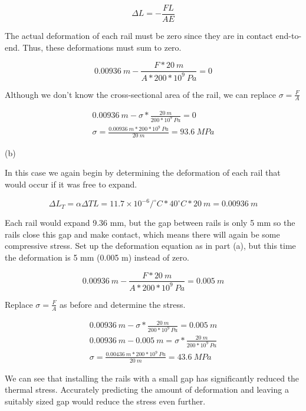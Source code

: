 \documentclass[
  letterpaper,
  DIV=11,
  numbers=noendperiod]{scrreprt}
\begin{document}
\begin{tcolorbox}
\begin{tcolorbox}
\[
\Delta L=-\frac{F L}{A E}
\]

The actual deformation of each rail must be zero since they are in
contact end-to-end. Thus, these deformations must sum to zero.

\[
0.00936{~m}-\frac{F * 20{~m}}{A * 200 * 10^9{~Pa}}=0
\]

Although we don't know the cross-sectional area of the rail, we can
replace \(\sigma=\frac{F}{A}\)

\[
\begin{gathered}
0.00936{~m}-\sigma * \frac{20{~m}}{200 * 10^9{~Pa}}=0 \\
\sigma=\frac{0.00936{~m} * 200 * 10^9{~Pa}}{20{~m}}=93.6{~MPa}
\end{gathered}
\]

(b)

In this case we again begin by determining the deformation of each rail
that would occur if it was free to expand.

\[
\Delta L_T=\alpha \Delta T L=11.7 \times 10^{-6}/^\circ{C} * 40^\circ{C} * 20{~m}=0.00936{~m}
\]

Each rail would expand 9.36 mm, but the gap between rails is only 5 mm
so the rails close this gap and make contact, which means there will
again be some compressive stress. Set up the deformation equation as in
part (a), but this time the deformation is 5 mm (0.005 m) instead of
zero.

\[
0.00936{~m}-\frac{F * 20{~m}}{A * 200 * 10^9{~Pa}}=0.005{~m}
\]

Replace \(\sigma=\frac{F}{A}\) as before and determine the stress.

\[
\begin{gathered}
0.00936{~m}-\sigma * \frac{20{~m}}{200 * 10^9{~Pa}}=0.005{~m} \\
0.00936{~m}-0.005{~m}=\sigma * \frac{20{~m}}{200 * 10^9{~Pa}} \\
\sigma=\frac{0.00436{~m} * 200 * 10^9{~Pa}}{20{~m}}=43.6{~MPa}
\end{gathered}
\]

We can see that installing the rails with a small gap has significantly
reduced the thermal stress. Accurately predicting the amount of
deformation and leaving a suitably sized gap would reduce the stress
even further.

\end{tcolorbox}

\end{tcolorbox}
\end{document}
